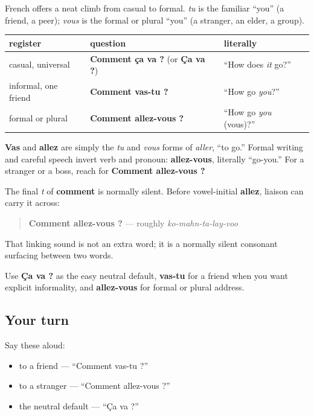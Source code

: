 \begin{grammarlens}[title={Grammar Lens: a ladder of three registers}]
French offers a neat climb from casual to formal. \emph{tu} is the familiar “you” (a friend, a peer); \emph{vous} is the formal or plural “you” (a stranger, an elder, a group).

\noindent
\begin{tabularx}{\linewidth}{@{}>{\raggedright\arraybackslash}X>{\raggedright\arraybackslash}X>{\raggedright\arraybackslash}X@{}}
\toprule
\textbf{register} & \textbf{question} & \textbf{literally} \\
\midrule
casual, universal & \textbf{Comment ça va ?} (or \textbf{Ça va ?}) & “How does \emph{it} go?” \\
informal, one friend & \textbf{Comment vas-tu ?} & “How go \emph{you}?” \\
formal or plural & \textbf{Comment allez-vous ?} & “How go \emph{you} (vous)?” \\
\bottomrule
\end{tabularx}

\textbf{Vas} and \textbf{allez} are simply the \emph{tu} and \emph{vous} forms of \emph{aller}, “to go.” Formal writing and careful speech invert verb and pronoun: \textbf{allez-vous}, literally “go-you.” For a stranger or a boss, reach for \textbf{Comment allez-vous ?}
\end{grammarlens}

\begin{sounds}
The final \emph{t} of \textbf{comment} is normally silent. Before vowel-initial \textbf{allez}, liaison can carry it across:

\begin{quote}
\textbf{Comment allez-vous ?} — roughly \emph{ko-mahn-ta-lay-voo}
\end{quote}

That linking sound is not an extra word; it is a normally silent consonant surfacing between two words.

Use \textbf{Ça va ?} as the easy neutral default, \textbf{vas-tu} for a friend when you want explicit informality, and \textbf{allez-vous} for formal or plural address.
\end{sounds}

\subsection*{Your turn}
Say these aloud:

\begin{itemize}
\raggedright
  \item to a friend — “Comment vas-tu ?”
  \item to a stranger — “Comment allez-vous ?”
  \item the neutral default — “Ça va ?”
\end{itemize}

